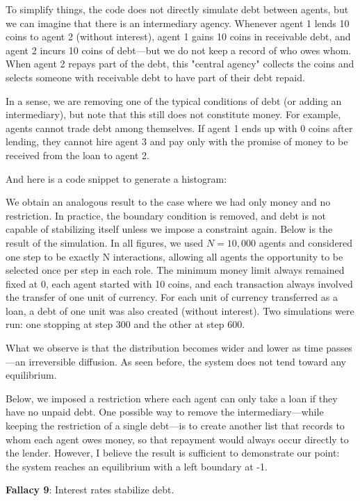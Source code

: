 To simplify things, the code does not directly simulate debt between agents, but we can imagine that there is an intermediary agency. Whenever agent 1 lends 10 coins to agent 2 (without interest), agent 1 gains 10 coins in receivable debt, and agent 2 incurs 10 coins of debt—but we do not keep a record of who owes whom. When agent 2 repays part of the debt, this "central agency" collects the coins and selects someone with receivable debt to have part of their debt repaid.

In a sense, we are removing one of the typical conditions of debt (or adding an intermediary), but note that this still does not constitute money. For example, agents cannot trade debt among themselves. If agent 1 ends up with 0 coins after lending, they cannot hire agent 3 and pay only with the promise of money to be received from the loan to agent 2.

 And here is a code snippet to generate a histogram: 

 We obtain an analogous result to the case where we had only money and no restriction. In practice, the boundary condition is removed, and debt is not capable of stabilizing itself unless we impose a constraint again. Below is the result of the simulation. In all figures, we used $N = 10,000$ agents and considered one step to be exactly N interactions, allowing all agents the opportunity to be selected once per step in each role. The minimum money limit always remained fixed at 0, each agent started with 10 coins, and each transaction always involved the transfer of one unit of currency. For each unit of currency transferred as a loan, a debt of one unit was also created (without interest). Two simulations were run: one stopping at step 300 and the other at step 600.

What we observe is that the distribution becomes wider and lower as time passes—an irreversible diffusion. As seen before, the system does not tend toward any equilibrium.

Below, we imposed a restriction where each agent can only take a loan if they have no unpaid debt. One possible way to remove the intermediary—while keeping the restriction of a single debt—is to create another list that records to whom each agent owes money, so that repayment would always occur directly to the lender. However, I believe the result is sufficient to demonstrate our point: the system reaches an equilibrium with a left boundary at -1. 

 \textbf{Fallacy 9}: Interest rates stabilize debt.

